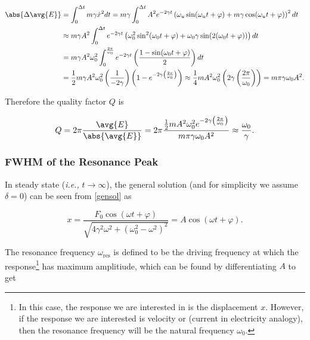 \documentclass[english,a4paper,12pt]{report}
\begin{document}
\begin{equation}
    \begin{aligned} 
    \abs{\Delta \avg{E} }  &= \int_{0}^{\Delta t} m\gamma \dot{x} ^2 dt = m\gamma \int_{0}^{\Delta t} A^2e^{-2\gamma t} \left(  \omega _{u}\sin (\omega _{u}t+\varphi  ) + m\gamma \cos (\omega _{u}t+\varphi  )  \right)^2 dt\\
    &\approx  m\gamma A^2\int_{0}^{\Delta t} e^{-2\gamma t} \left( \omega _{0}^2\sin ^2(\omega _{0}t+\varphi  ) + \omega _{0}\gamma \sin (2(\omega _{0}t+\varphi  )) \right)dt \\
    &= m\gamma A^2 \omega _{0}^2 \int_{0}^{\frac{2\pi }{\omega _{0} } } e^{-2\gamma t} \left( \frac{1-\sin (\omega _{0}t+\varphi  )}{2}  \right)dt \\
    &= \frac{1}{2}m\gamma A^2\omega _{0}^2 \left( \frac{1}{-2\gamma }  \right) \left(1- e^{-2\gamma \left( \frac{2\pi }{\omega _{0} }  \right)} \right)  \approx  \frac{1}{4}mA^2\omega _{0}^2\left(2\gamma \left( \frac{2\pi }{\omega _{0} }  \right)\right) = m\pi \gamma \omega _{0} A^2.  
    \end{aligned} 
\end{equation}

Therefore the quality factor \(Q\) is 

\begin{equation}
    Q = 2\pi \frac{\avg{E} }{\abs{\avg{E} } } = 2\pi \frac{\frac{1}{2}mA^2\omega _{0}^2e^{-2\gamma \left( \frac{2\pi }{\omega _{0} }  \right)}   }{m\pi \gamma \omega _{0}A^2 } \approx \frac{\omega _{0} }{\gamma }. 
\end{equation}

\subsubsection{FWHM of the Resonance Peak}

In steady state (\textit{i.e.,} \(t \to \infty\)), the general solution (and for simplicity we assume \(\delta = 0\)) can be seen from \cref{gensol} as 

\begin{equation}
    x = \frac{F_0 \cos  (\omega t+\varphi )}{\sqrt{4\gamma ^2\omega ^2+ (\omega _{0}^2 - \omega ^2 )^2} } = A \cos (\omega t+\varphi ).
\end{equation}

The resonance frequency \(\omega _{\text{res} } \) is defined to be the driving frequency at which the response\footnote{In this case, the response we are interested in is the displacement \(x\). However, if the response we are interested is velocity or (current in electricity analogy), then the resonance frequency will be the natural frequency \(\omega _{0} \).} has maximum amplitiude, which can be found by differentiating \(A\) to get
\end{document}
